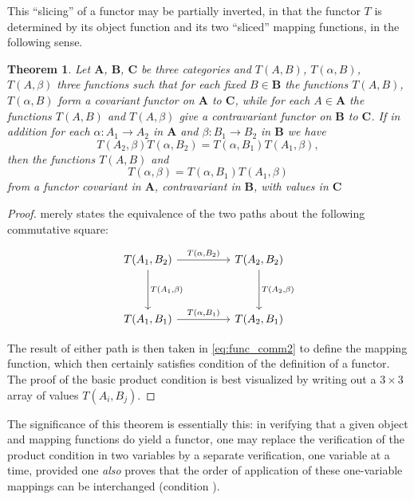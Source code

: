 \documentclass[11pt,a4paper]{report}
\newtheorem{theorem}{Theorem}
\begin{document}
This ``slicing'' of a functor may be partially inverted, in that the functor $T$ is determined by its object function
and its two ``sliced'' mapping functions, in the following sense.
\begin{theorem}\label{thm:func_comm}
	Let $\mathbf{A}$, $\mathbf{B}$, $\mathbf{C}$ be three categories and $T(A,B)$, $T(\alpha,B)$, $T(A,\beta)$
	three functions such that for each fixed $B\in\mathbf{B}$ the functions $T(A,B)$, $T(\alpha,B)$ form a
	covariant functor on $\mathbf{A}$ to $\mathbf{C}$, while for each $A\in\mathbf{A}$ the functions $T(A,B)$
	and $T(A,\beta)$ give a contravariant functor on $\mathbf{B}$ to $\mathbf{C}$. If in addition for each
	$\alpha:A_1\rightarrow A_2$ in $\mathbf{A}$ and $\beta:B_1\rightarrow B_2$ in $\mathbf{B}$ we have
	\begin{equation}\label{eq:func_comm1}
		T(A_2,\beta) T(\alpha,B_2) = T(\alpha,B_1) T(A_1,\beta),
	\end{equation}
	then the functions $T(A,B)$ and
	\begin{equation}\label{eq:func_comm2}
		T(\alpha,\beta)=T(\alpha,B_1)T(A_1,\beta)
	\end{equation}
	from a functor covariant in $\mathbf{A}$, contravariant in $\mathbf{B}$, with values in $\mathbf{C}$
\end{theorem}
\begin{proof}
	 merely states the equivalence of the two paths about the following
	commutative square:
\begin{equation*}
	\begin{tikzpicture}
		\node (a) at (0,0)
		{ \begin{tikzcd}[sep=huge]
			T({A_1,B_2}) \arrow[r,"{T(\alpha,B_2)}"] \arrow[d, "{T(A_1,\beta)}"] & T(A_2,B_2) 
			\arrow[d,"{T(A_2,\beta)}"] \\
			T(A_1,B_1) \arrow[r,"{T(\alpha,B_1)}"] & T(A_2,B_1)
		\end{tikzcd}};
	\end{tikzpicture}
\end{equation*}
	The result of either path is then taken in \cref{eq:func_comm2} to define the mapping function,
	which then certainly satisfies condition  of the
	definition of a functor. The proof of the basic product condition  is best
	visualized by writing out a $3\times 3$ array of values $T(A_i,B_j)$.
\end{proof}
\pagebreak[2]
The significance of this theorem is essentially this: in verifying that a given object and mapping functions
do yield a functor, one may replace the verification of the product condition  in
two variables by a separate verification, one variable at a time, provided one \emph{also} proves that the
order of application of these one-variable mappings can be interchanged (condition ).
\end{document}
